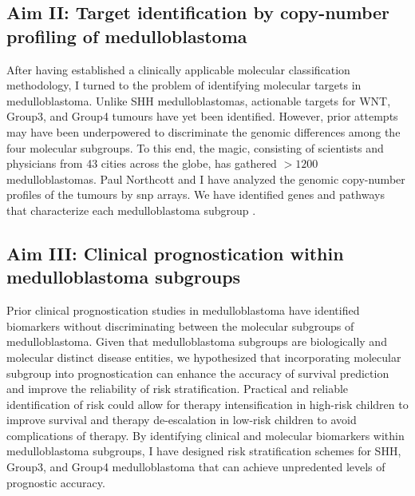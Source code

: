 \subsection*{Aim II: Target identification by copy-number profiling of medulloblastoma}

After having established a clinically applicable molecular classification methodology, I turned to the problem of identifying molecular targets in medulloblastoma. Unlike SHH medulloblastomas, actionable targets for WNT, Group3, and Group4 tumours have yet been identified. However, prior attempts may have been underpowered to discriminate the genomic differences among the four molecular subgroups. To this end, the \gls{magic}, consisting of scientists and physicians from 43 cities across the globe, has gathered $>1200$ medulloblastomas. Paul Northcott and I have analyzed the genomic copy-number profiles of the tumours by \gls{snp} arrays. We have identified genes and pathways that characterize each medulloblastoma subgroup .


\subsection*{Aim III: Clinical prognostication within medulloblastoma subgroups}

Prior clinical prognostication studies in medulloblastoma have identified biomarkers without discriminating between the molecular subgroups of medulloblastoma. Given that medulloblastoma subgroups are biologically and molecular distinct disease entities, we hypothesized that incorporating molecular subgroup into prognostication can enhance the accuracy of survival prediction and improve the reliability of risk stratification. Practical and reliable identification of risk could allow for therapy intensification in high-risk children to improve survival and therapy de-escalation in low-risk children to avoid complications of therapy. By identifying clinical and molecular biomarkers within medulloblastoma subgroups, I have designed risk stratification schemes for SHH, Group3, and Group4 medulloblastoma that can achieve unpredented levels of prognostic accuracy.
